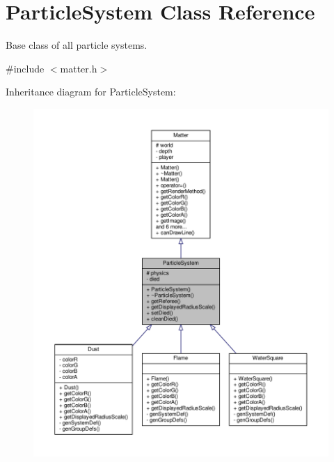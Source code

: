 \hypertarget{classParticleSystem}{}\section{Particle\+System Class Reference}
\label{classParticleSystem}


Base class of all particle systems.  




{\ttfamily \#include $<$matter.\+h$>$}



Inheritance diagram for Particle\+System\+:
\nopagebreak
\begin{figure}[H]
\begin{center}
\leavevmode
\includegraphics[width=350pt]{classParticleSystem__inherit__graph}
\end{center}
\end{figure}


